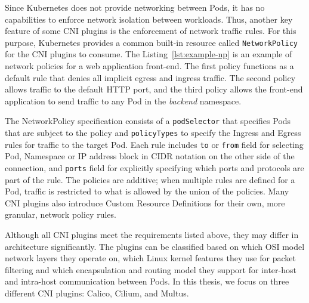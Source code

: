 \documentclass[english, 12pt, a4paper, sci, utf8, a-2b, online]{aaltothesis}
\begin{document}
Since Kubernetes does not provide networking between Pods, it has no capabilities to enforce network isolation between workloads.
Thus, another key feature of some CNI plugins is the enforcement of network traffic rules.
For this purpose, Kubernetes provides a common built-in resource called \texttt{NetworkPolicy} for the CNI plugins to consume.
The Listing~\ref{lst:example-np} is an example of network policies for a web application front-end.
The first policy functions as a default rule that denies all implicit egress and ingress traffic.
The second policy allows traffic to the default HTTP port, and the third policy allows the front-end application to send traffic to any Pod in the \emph{backend} namespace.



The NetworkPolicy specification consists of a \texttt{podSelector} that specifies Pods that are subject to the policy and \texttt{policyTypes} to specify the Ingress and Egress rules for traffic \cite{budigiri2021network} to the target Pod.
Each rule includes \texttt{to} or \texttt{from} field for selecting Pod, Namespace or IP address block in CIDR notation on the other side of the connection, and \texttt{ports} field for explicitly specifying which ports and protocols are part of the rule.
The policies are additive; when multiple rules are defined for a Pod, traffic is restricted to what is allowed by the union of the policies.
Many CNI plugins also introduce Custom Resource Definitions for their own, more granular, network policy rules.

Although all CNI plugins meet the requirements listed above, they may differ in architecture significantly.
The plugins can be classified based on which OSI model network layers they operate on, which Linux kernel features they use for packet filtering and which encapsulation and routing model they support for inter-host and intra-host communication between Pods.
In this thesis, we focus on three different CNI plugins: Calico, Cilium, and Multus.


\end{document}
